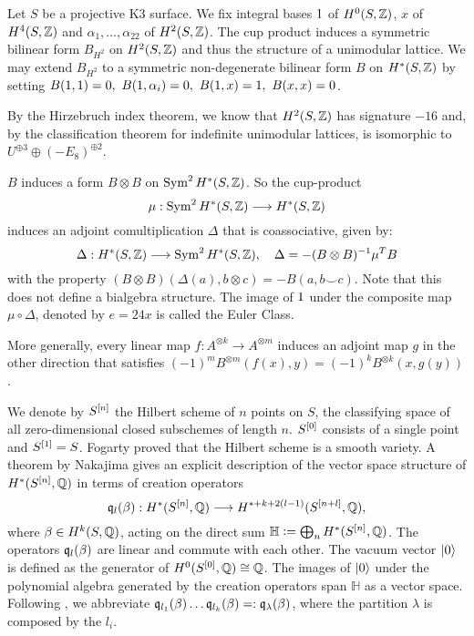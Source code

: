 \begin{definition}
Let $S$ be a projective K3 surface. We fix integral bases $1$ of $H^0(S,\mathbb{Z})$, $x$ of $H^4(S,\mathbb{Z})$ and $\alpha_1,\ldots ,\alpha_{22}$ of $H^2(S,\mathbb{Z})$. The cup product induces a symmetric bilinear form $B_{H^2}$ on $H^2(S,\mathbb{Z})$ and thus the structure of a unimodular lattice.
We may extend $B_{H^2}$ to a symmetric non-degenerate bilinear form $B$ on $H^\ast(S,\mathbb{Z})$ by setting $ B(1,1) = 0,\ B(1,\alpha_i) = 0,\ B(1,x) = 1, \ B(x,x) = 0$.
\end{definition}
By the Hirzebruch index theorem, we know that $H^2(S,\mathbb{Z})$ has signature $-16$ and, by the classification theorem for indefinite unimodular lattices, is isomorphic to $U^{\oplus 3}\oplus (-E_8)^{\oplus 2}$.
\begin{definition}\label{comult}
$B$ induces a form $B\otimes B$ on $\operatorname{Sym}^2H^\ast(S,\mathbb{Z})$. So the cup-product 
\begin{equation*}
\mu : \operatorname{Sym} ^2H^{*}(S,\mathbb{Z}) \longrightarrow H^\ast(S,\mathbb{Z}) 
\end{equation*}
induces an adjoint comultiplication $\Delta$ that is coassociative, given by:
\begin{equation*}
\Delta : H^\ast(S,\mathbb{Z}) \longrightarrow \operatorname{Sym}^2H^\ast(S,\mathbb{Z}),\quad \Delta = -(B\otimes B)^{-1}\mu^TB
\end{equation*}
with the property $(B\otimes B)\left(\Delta(a),b\otimes c\right)=-B\left(a,b\smile c\right)$. Note that this does not define a bialgebra structure.
The image of $1$ under the composite map $\mu\circ\Delta$, denoted by $e=24x$ is called the Euler Class.

More generally, every linear map $f: A^{\otimes k} \rightarrow A^{\otimes m}$ induces an adjoint map $g$ in the other direction that satisfies $(-1)^mB^{\otimes m}(f(x),y)= (-1)^{k} B^{\otimes k}(x,g(y))$.
\end{definition}
We denote by $S^{[n]}$ the Hilbert scheme of $n$ points on $S$, \ie the classifying space of all zero-dimensional closed subschemes of length $n$. $S^{[0]}$ consists of a single point and $S^{[1]}=S$. Fogarty \cite[Thm.~2.4]{Fogarty} proved that the Hilbert scheme is a smooth variety.
A theorem by Nakajima \cite{Nakajima} gives an explicit description of the vector space structure of $H^\ast(S^{[n]},\mathbb{Q})$ in terms of creation operators
$$
\mathfrak{q}_l(\beta) :  H^\ast(S^{[n]},\mathbb{Q}) \longrightarrow  H^{\ast+k+2(l-1)}(S^{[n+l]},\mathbb{Q})
,$$ 
where $\beta\in H^k(S,\mathbb{Q})$, acting on the direct sum 
$\mathbb{H}\vcentcolon= \bigoplus_n H^\ast(S^{[n]},\mathbb{Q})$. The operators $\mathfrak{q}_l(\beta)$ are linear and commute with each other. The vacuum vector $|0\rangle$ is defined as the generator of $H^0(S^{[0]},\mathbb{Q})\cong\mathbb{Q}$. The images of $|0\rangle$ under the polynomial algebra generated by the creation operators span $\mathbb{H}$ as a vector space. 
Following \cite{QinWang}, we abbreviate $\mathfrak{q}_{l_1}(\beta)\ldots\mathfrak{q}_{l_k}(\beta)=:\mathfrak{q}_\lambda(\beta)$, where the partition $\lambda$ is composed by the $l_i$. 


